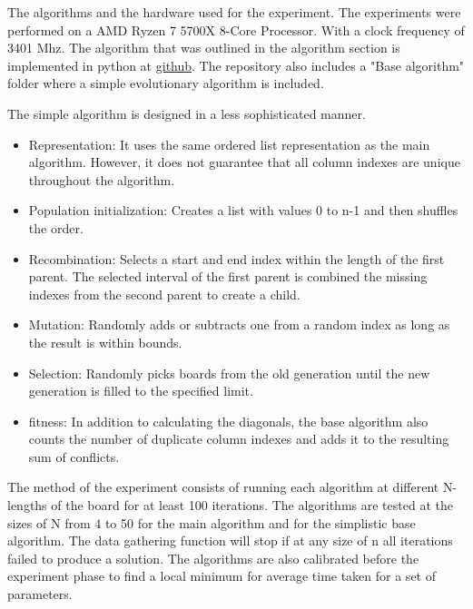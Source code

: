 \documentclass{scrartcl}
\begin{document}
The algorithms and the hardware used for the experiment. The experiments were performed on a AMD Ryzen 7 5700X 8-Core Processor. With a clock frequency of 3401 Mhz. The algorithm that was outlined in the algorithm section is implemented in python at \href{https://github.com/Sneakycloud/N-queens\_problem\_Evolutionary\_Alg/tree/main}{github}. The repository also includes a "Base algorithm" folder where a simple evolutionary algorithm is included.

The simple algorithm is designed in a less sophisticated manner.
\begin{itemize}
	\item Representation: It uses the same ordered list representation as the main algorithm. However, it does not guarantee that all column indexes are unique throughout the algorithm.
	\item Population initialization:  Creates a list with values 0 to n-1 and then shuffles the order.
	\item Recombination: Selects a start and end index within the length of the first parent. The selected interval of the first parent is combined the missing indexes from the second parent to create a child.
	\item Mutation: Randomly adds or subtracts one from a random index as long as the result is within bounds.
	\item Selection: Randomly picks boards from the old generation until the new generation is filled to the specified limit.
	\item fitness: In addition to calculating the diagonals, the base algorithm also counts the number of duplicate column indexes and adds it to the resulting sum of conflicts. 
\end{itemize}

The method of the experiment consists of running each algorithm at different N-lengths of the board for at least 100 iterations. The algorithms are tested at the sizes of N from 4 to 50 for the main algorithm and for the simplistic base algorithm. The data gathering function will stop if at any size of n all iterations failed to produce a solution. The algorithms are also calibrated before the experiment phase to find a local minimum for average time taken for a set of parameters.
\end{document}
